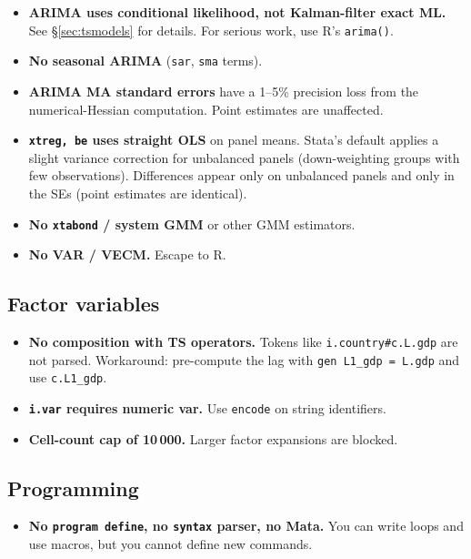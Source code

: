 \documentclass[11pt,letterpaper]{article}
\begin{document}
\begin{itemize}[leftmargin=*]
\item \textbf{ARIMA uses conditional likelihood, not Kalman-filter exact
ML.}  See \S\ref{sec:tsmodels} for details.  For serious work, use R's
\texttt{arima()}.
\item \textbf{No seasonal ARIMA} (\texttt{sar}, \texttt{sma} terms).
\item \textbf{ARIMA MA standard errors} have a 1--5\% precision loss
from the numerical-Hessian computation.  Point estimates are unaffected.
\item \textbf{\texttt{xtreg, be} uses straight OLS} on panel means.
Stata's default applies a slight variance correction for unbalanced
panels (down-weighting groups with few observations).  Differences
appear only on unbalanced panels and only in the SEs (point estimates
are identical).
\item \textbf{No \texttt{xtabond} / system GMM} or other GMM estimators.
\item \textbf{No VAR / VECM.}  Escape to R.
\end{itemize}

\subsection{Factor variables}

\begin{itemize}[leftmargin=*]
\item \textbf{No composition with TS operators.}  Tokens like
\texttt{i.country\#c.L.gdp} are not parsed.  Workaround: pre-compute
the lag with \texttt{gen L1\_gdp = L.gdp} and use \texttt{c.L1\_gdp}.
\item \textbf{\texttt{i.var} requires numeric var.}  Use \texttt{encode}
on string identifiers.
\item \textbf{Cell-count cap of 10\,000.}  Larger factor expansions
are blocked.
\end{itemize}

\subsection{Programming}

\begin{itemize}[leftmargin=*]
\item \textbf{No \texttt{program define}, no \texttt{syntax} parser,
no Mata.}  You can write loops and use macros, but you cannot define
new commands.
\end{itemize}
\end{document}
